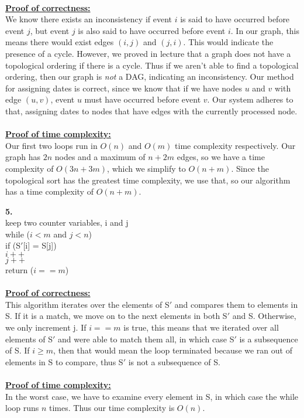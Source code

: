 \documentclass[10pt, letterpaper]{report}
\begin{document}
\\
\textbf{\underline{Proof of correctness:}}\\
We know there exists an inconsistency if event $i$ is said to have occurred before event $j$, but event $j$ is also said to have occurred before event $i$. In our graph, this means there would exist edges $(i, j)$ and $(j, i)$. This would indicate the presence of a cycle. However, we proved in lecture that a graph does not have a topological ordering if there is a cycle. Thus if we aren't able to find a topological ordering, then our graph is \textit{not} a DAG, indicating an inconsistency. Our method for assigning dates is correct, since we know that if we have nodes $u$ and $v$ with edge $(u,v)$, event $u$ must have occurred before event $v$. Our system adheres to that, assigning dates to nodes that have edges with the currently processed node.\\
\\
\textbf{\underline{Proof of time complexity:}}\\
Our first two loops run in $O(n)$ and $O(m)$ time complexity respectively. Our graph has $2n$ nodes and a maximum of $n+2m$ edges, so we have a time complexity of $O(3n+3m)$, which we simplify to $O(n+m)$. Since the topological sort has the greatest time complexity, we use that, so our algorithm has a time complexity of $O(n+m)$.

\newpage
\noindent \large{\textbf{5.} } \\
keep two counter variables, i and j\\
while ($i < m$ and $j < n$)\\
\indent if (S$'$[i] = S[j])\\
\indent\indent $i++$\\
\indent $j++$\\
return ($i == m$)\\
\\
\textbf{\underline{Proof of correctness:}}\\
This algorithm iterates over the elements of S$'$ and compares them to elements in S. If it is a match, we move on to the next elements in both S$'$ and S. Otherwise, we only increment j. If $i == m$ is true, this means that we iterated over all elements of S$'$ and were able to match them all, in which case S$'$ is a subsequence of S. If $i \geq m$, then that would mean the loop terminated because we ran out of elements in S to compare, thus S$'$ is not a subsequence of S.\\
\\
\textbf{\underline{Proof of time complexity:}}\\
In the worst case, we have to examine every element in S, in which case the while loop runs $n$ times. Thus our time complexity is $O(n)$.
\end{document}
